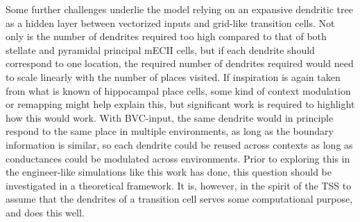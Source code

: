 \documentclass{article}
\begin{document}
    Some further challenges underlie the model relying on an expansive dendritic tree as a hidden layer between vectorized inputs and grid-like transition cells. Not only is the number of dendrites required too high compared to that of both stellate and pyramidal principal mECII cells, but if each dendrite should correspond to one location, the required number of dendrites required would need to scale linearly with the number of places visited. If inspiration is again taken from what is known of hippocampal place cells, some kind of context modulation or remapping might help explain this, but significant work is required to highlight how this would work. With BVC-input, the same dendrite would in principle respond to the same place in multiple environments, as long as the boundary information is similar, so each dendrite could be reused across contexts as long as conductances could be modulated across environments. Prior to exploring this in the engineer-like simulations like this work has done, this question should be investigated in a theoretical framework.
    It is, however, in the spirit of the TSS to assume that the dendrites of a transition cell serves some computational purpose, and does this well.
\end{document}
